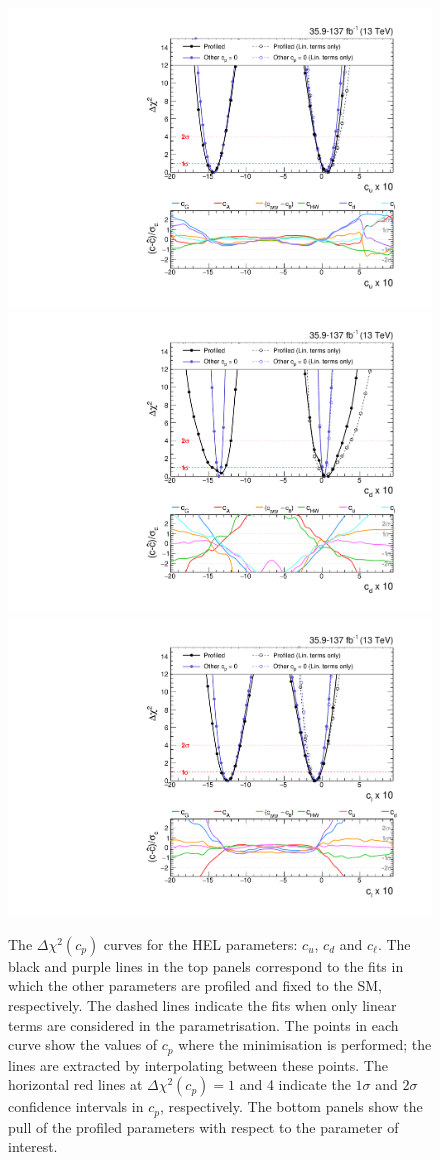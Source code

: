 
\begin{figure}[htb!]
  \centering
  \includegraphics[width=.49\textwidth]{Figures/eft/chi2/observed/cu.pdf}
  \includegraphics[width=.49\textwidth]{Figures/eft/chi2/observed/cd.pdf}
  \includegraphics[width=.49\textwidth]{Figures/eft/chi2/observed/cl.pdf}
  \caption[Simplified HEL re-interpretation: $c_u$, $c_d$ and $c_{\ell}$]
  {
    The $\Delta\chi^2(c_p)$ curves for the HEL parameters: $c_u$, $c_d$ and $c_\ell$. The black and purple lines in the top panels correspond to the fits in which the other parameters are profiled and fixed to the SM, respectively. The dashed lines indicate the fits when only linear terms are considered in the parametrisation. The points in each curve show the values of $c_p$ where the minimisation is performed; the lines are extracted by interpolating between these points. The horizontal red lines at $\Delta\chi^2(c_p)=1$ and 4 indicate the $1\sigma$ and $2\sigma$ confidence intervals in $c_p$, respectively. The bottom panels show the pull of the profiled parameters with respect to the parameter of interest. 
}
\end{figure}
